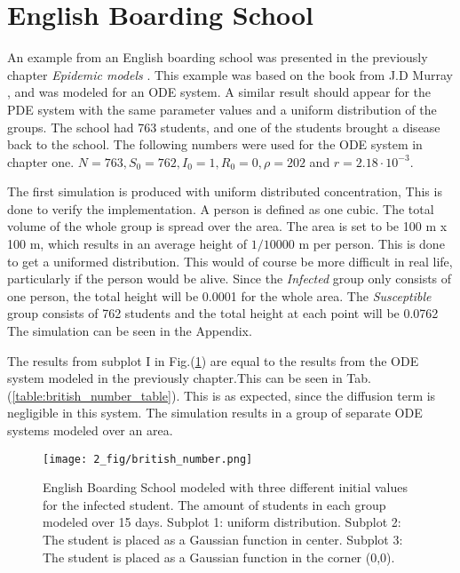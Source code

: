 \documentclass[%
twoside,                 %
final,                   %
chapterprefix=true,      %
open=right               %
10pt]{book}
\begin{document}
\section{English Boarding School}
An example from an English boarding school was presented in the previously chapter \emph{Epidemic models} . This example was based on the book from J.D Murray \cite{murray2002mathematical}, and was modeled for an ODE system. A similar result should appear for the PDE system with the same parameter values and a uniform distribution of the groups. The school had 763 students, and one of the students brought a disease back to the school. The following numbers were used for the ODE system in chapter one. $N=763, S_0=762,I_0=1,R_0=0,\rho=202$ and $r = 2.18\cdot 10^{-3}$. 


\vspace{3mm}




\vspace{3mm}


The first simulation is produced with uniform distributed concentration, This is done to verify the implementation. A person is defined as one cubic. The total volume of the whole group is spread over the area. The area is set to be 100 m x 100 m, which results in an average height of $1/10000$ m per person. This is done to get a uniformed distribution. This would of course be more difficult in real life, particularly if the person would be alive. Since the \emph{Infected} group only consists of one person, the total height will be 0.0001 for the whole area. The \emph{Susceptible} group consists of 762 students and the total height at each point will be 0.0762 The simulation can be seen in the Appendix. 


\vspace{3mm}




\vspace{3mm}


The results from subplot I in Fig.(\ref{fig:british_number}) are equal to the results from the ODE system modeled in the previously chapter.This can be seen in Tab.(\ref{table:british_number_table}). This is as expected, since the diffusion term is negligible in this system. The simulation results in a group of separate ODE systems modeled over an area.


\begin{figure}[ht]
  \centerline{\texttt{[image: 2\_fig/british\_number.png]}}
  \caption{
  \label{fig:british_number} English Boarding School modeled with three different initial values for the infected student. The amount of students in each group modeled over 15 days. Subplot 1: uniform distribution. Subplot 2: The student is placed as a Gaussian function in center. Subplot 3: The student is placed as a Gaussian function in the corner (0,0).
  }
\end{figure}
\end{document}
